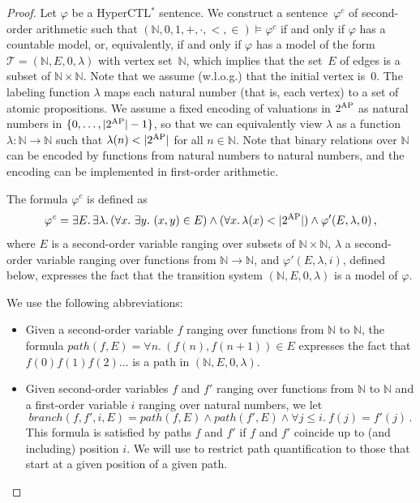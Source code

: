 \documentclass[dvipsnames,10pt,a4paper]{amsart}
\theoremstyle{definition}
\theoremstyle{remark}
\newcommand{\nats}{\mathbb{N}}
\renewcommand{\phi}{\varphi}
\newcommand{\size}[1]{|#1|}
\newcommand{\tsys}{\mathcal{T}}
\newcommand{\hyctlstar}{{HyperCTL$^*$}\xspace}
\newcommand\AP{\textup{AP}}
\renewcommand{\phi}{\varphi}
\newcommand\phicount{\phi^{\mathit{c}}}
\begin{document}
\begin{proof}
  Let $\phi$ be a \hyctlstar sentence. We construct a sentence~$\phicount$ of second-order
  arithmetic such that
  $(\nats,0,1,+,\cdot,<,\in) \models \phicount$ if and only if $\phi$
  has a countable model, or, equivalently, if and only if $\phi$ has a model
  of the form $\tsys = (\nats,E,0,\lambda)$ with vertex set~$\nats$, which
 implies that
  the set~$E$ of edges is a subset of $\nats \times \nats$.
  Note that we assume (w.l.o.g.) that the initial
  vertex is~$0$. The labeling function $\lambda$ maps each natural number
  (that is, each vertex) to a set of atomic propositions.
  We assume a fixed encoding of valuations in $2^\AP$ as natural numbers in
  $\{0,\ldots,|2^{\AP}|-1\}$, so that we can equivalently view $\lambda$ as a
  function $\lambda : \nats \rightarrow \nats$ such that $\lambda(n) < \size{2^{\AP}}$
  for all $n \in \nats$. Note that binary relations over $\nats$ can be encoded by functions from natural numbers to natural numbers, and the encoding can be implemented in first-order arithmetic.

  The formula $\phicount$ is defined as
  \[
    \phicount = \exists E.\, \exists \lambda.\,
    (\forall x.\ \exists y.\ (x,y) \in E) \land
    (\forall x.\, \lambda(x) < |2^\AP|) \land 
    \phi'(E,\lambda,0) \, ,
  \]
  where $E$ is a second-order variable ranging over subsets of
  $\nats \times \nats$,
  $\lambda$ a second-order variable ranging over functions from $\nats \to  \nats$,
  and $\phi'(E,\lambda,i)$, defined below, expresses the fact that
  the transition system $(\nats,E,0,\lambda)$ is a model of $\phi$. 
  
  We use the following abbreviations:
  \begin{itemize}
  \item Given a second-order variable $f$ ranging over functions from
    $\nats$ to $\nats$, the formula
    $\mathit{path}(f,E) = \forall n.\ (f(n),f(n+1)) \in E$
    expresses the fact that $f(0) f(1) f(2) \ldots$ is
    a path in $(\nats,E,0,\lambda)$.

  \item Given second-order variables $f$ and $f'$ ranging over functions from
    $\nats$ to $\nats$ and a first-order variable $i$ ranging over natural
    numbers, we let
    \[
      \mathit{branch}(f,f',i,E) = \mathit{path}(f,E) \land \mathit{path}(f',E) \land \forall j \le i.\ 
      f(j) = f'(j) \, .
    \]
    This formula is satisfied by paths $f$ and $f'$ if $f$ and $f'$ coincide up to (and including) position $i$. We will use to restrict path quantification to those that start at a given position of a given path.
  \end{itemize}


\end{proof}
\end{document}
